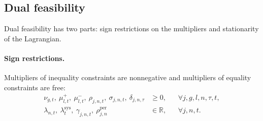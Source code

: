 \documentclass[11pt,a4paper,fleqn]{article}
\numberwithin{equation}{section}
\begin{document}
\subsection{Dual feasibility}

Dual feasibility has two parts: sign restrictions on the multipliers and
stationarity of the Lagrangian.

\paragraph{Sign restrictions.}
Multipliers of inequality constraints are nonnegative and multipliers of
equality constraints are free:
\begin{subequations}\label{eq:dual-signs}
\begin{align}
\nu_{g,t},\ \mu^+_{l,t},\ \mu^-_{l,t},\
\rho_{j,n,t},\ \sigma_{j,n,t},\ \delta_{j,n,\tau}
&\geq 0,
&& \forall j,g,l,n,\tau,t,
\label{eq:nonnegative-duals}\\
\lambda_{n,t},\ \lambda^{\mathrm{sys}}_t,\
\gamma_{j,n,t},\ \rho^{\mathrm{per}}_{j,n}
&\in\mathbb R,
&& \forall j,n,t.
\label{eq:free-duals}
\end{align}
\end{subequations}
\end{document}
